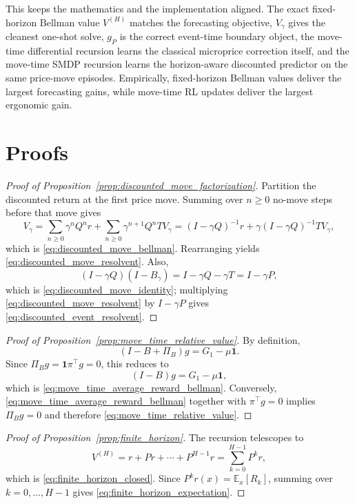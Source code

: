 \documentclass[11pt,twoside]{article}
\theoremstyle{plain}
\theoremstyle{definition}
\theoremstyle{remark}
\newcommand{\1}{\mathbf{1}}
\newcommand{\E}{\mathbb{E}}
\newcommand{\PiB}{\Pi_B}
\begin{document}
This keeps the mathematics and the implementation aligned. The exact fixed-horizon Bellman value $V^{(H)}$ matches the forecasting objective, $V_\gamma$ gives the cleanest one-shot solve, $g_P$ is the correct event-time boundary object, the move-time differential recursion learns the classical microprice correction itself, and the move-time SMDP recursion learns the horizon-aware discounted predictor on the same price-move episodes. Empirically, fixed-horizon Bellman values deliver the largest forecasting gains, while move-time RL updates deliver the largest ergonomic gain.

\appendix

\section{Proofs}

\begin{proof}[Proof of Proposition~\ref{prop:discounted_move_factorization}]
Partition the discounted return at the first price move. Summing over $n\ge 0$ no-move steps before that move gives
\[
V_\gamma
=
\sum_{n\ge 0}\gamma^n Q^n r
+
\sum_{n\ge 0}\gamma^{n+1}Q^n T V_\gamma
=
(I-\gamma Q)^{-1}r+\gamma(I-\gamma Q)^{-1}T V_\gamma,
\]
which is \eqref{eq:discounted_move_bellman}. Rearranging yields \eqref{eq:discounted_move_resolvent}. Also,
\[
(I-\gamma Q)(I-B_\gamma)=I-\gamma Q-\gamma T=I-\gamma P,
\]
which is \eqref{eq:discounted_move_identity}; multiplying \eqref{eq:discounted_move_resolvent} by $I-\gamma P$ gives \eqref{eq:discounted_event_resolvent}.
\end{proof}

\begin{proof}[Proof of Proposition~\ref{prop:move_time_relative_value}]
By definition,
\[
(I-B+\PiB)g=G_1-\mu\1.
\]
Since $\PiB g=\1\pi^\top g=0$, this reduces to
\[
(I-B)g=G_1-\mu\1,
\]
which is \eqref{eq:move_time_average_reward_bellman}. Conversely, \eqref{eq:move_time_average_reward_bellman} together with $\pi^\top g=0$ implies $\PiB g=0$ and therefore \eqref{eq:move_time_relative_value}.
\end{proof}

\begin{proof}[Proof of Proposition~\ref{prop:finite_horizon}]
The recursion telescopes to
\[
V^{(H)}=r+Pr+\cdots+P^{H-1}r=\sum_{k=0}^{H-1}P^k r,
\]
which is \eqref{eq:finite_horizon_closed}. Since $P^k r(x)=\E_x[R_k]$, summing over $k=0,\dots,H-1$ gives \eqref{eq:finite_horizon_expectation}.
\end{proof}
\end{document}
